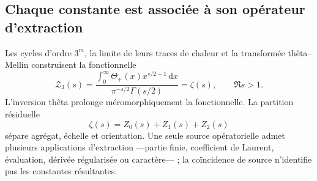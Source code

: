 \subsection{Chaque constante est associée à son opérateur d'extraction}

Les cycles d'ordre \(3^m\), la limite de leurs traces de chaleur et la
transformée thêta--Mellin construisent la fonctionnelle
\begin{equation}
 \mathcal Z_3(s)
 =\frac{\displaystyle
 \int_0^\infty\Theta_+(x)x^{s/2-1}\,\mathrm dx}
 {\pi^{-s/2}\Gamma(s/2)}
 =\zeta(s),
 \qquad \Re s>1.
 \label{p3-83-c44-s1:eq:funcional-triadico-resumen-rev11}
\end{equation}
L'inversion thêta prolonge méromorphiquement la fonctionnelle. La partition
résiduelle
\[
 \zeta(s)=Z_0(s)+Z_1(s)+Z_2(s)
\]
sépare agrégat, échelle et orientation. Une seule source opératorielle admet
plusieurs applications d'extraction ---partie finie, coefficient de Laurent,
évaluation, dérivée régularisée ou caractère--- ; la coïncidence de source
n'identifie pas les constantes résultantes.

\par

